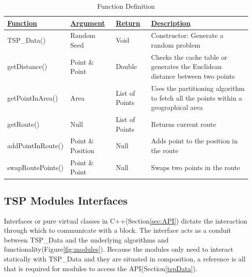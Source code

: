 \begin{table}[H]
    \centering
    \renewcommand{\arraystretch}{1.2} %
    \begin{tabularx}{\textwidth}{|p{3.2cm}|p{2.5cm}|p{2.5cm}|X|}
\hline
{\ul \textbf{Function}} & {\ul \textbf{Argument}} & {\ul \textbf{Return}} & {\ul \textbf{Description}}                                                       \\ \hline
TSP\_Data()             & Random Seed             & Void                  & Constructor: Generate a random problem                                           \\ \hline
getDistance()           & Point \& Point          & Double      & Checks the cache table or generates the Euclidean distance between two points         \\ \hline
getPointInArea()        & Area                    & List of Points        & Uses the partitioning algorithm to fetch all the points within a geographical area \\ \hline
getRoute()              & Null                    & List of Points        & Returns current route                                                            \\ \hline
addPointInRoute()       & Point \& Position       & Null                  & Adds point to the position in the route                                          \\ \hline
swapRoutePoints()       & Point \& Point          & Null                  & Swaps two points in the route                                                    \\ \hline
    \end{tabularx}
    \caption{Function Definition}
    \label{tab:functions}
\end{table}


\subsection{TSP Modules Interfaces}
\label{modules}

Interfaces or pure virtual classes in C++(Section\ref{sec:API}) dictate the interaction through which to communicate with a block. The interface acts as a conduit between TSP\_Data and the underlying algorithms and functionality(Figure\ref{fig:modules}). Because the modules only need to interact statically with TSP\_Data and they are situated in composition, a reference is all that is required for modules to access the API(Section\ref{tspData}).

